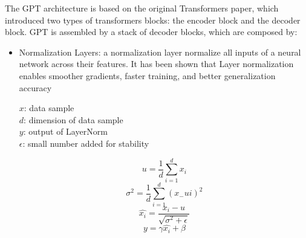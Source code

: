 \documentclass{article}
\begin{document}
The GPT architecture is based on the original Transformers paper, which introduced two types of transformers blocks: the encoder block and the decoder block. GPT is assembled by a stack of decoder blocks, which are composed by:
\begin{itemize}
    \item Normalization Layers: a normalization layer \cite{ba2016layer}  normalize all inputs of a neural network across their features. It has been shown that Layer normalization enables smoother gradients, faster training, and better
    generalization accuracy \cite{xu2019understanding}

    $x$: data sample \\
    $d$: dimension of data sample \\
    $y$: output of LayerNorm \\
    $\epsilon$: small number added for stability

    \begin{equation}
        u = \frac{1}{d}\sum_{i=1}^{d}x_i 
    \end{equation}
    \begin{equation}
        \sigma^2 = \frac{1}{d}\sum_{i=1}^{d}(x_ - ui)^2
    \end{equation}
    \begin{equation}
        \hat{x_i} = \frac{x_i - u}{\sqrt{\sigma^2 + \epsilon}}
    \end{equation}
    \begin{equation}
        y = \gamma\hat{x_i} + \beta
    \end{equation}


\end{itemize}
\end{document}
